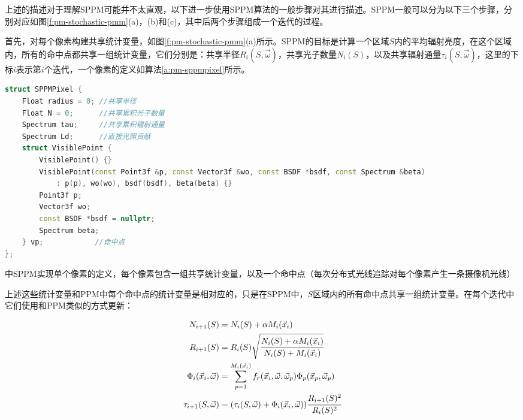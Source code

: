上述的描述对于理解SPPM可能并不太直观，以下进一步使用SPPM算法的一般步骤对其进行描述。SPPM一般可以分为以下三个步骤，分别对应如图\ref{f:pm-stochastic-pmm}(a)，(b)和(c)，其中后两个步骤组成一个迭代的过程。

首先，对每个像素构建共享统计变量，如图\ref{f:pm-stochastic-pmm}(a)所示。SPPM的目标是计算一个区域$S$内的平均辐射亮度，在这个区域内，所有的命中点都共享一组统计变量，它们分别是：共享半径$R_i(S,\vec{\omega})$，共享光子数量$N_i(S)$，以及共享辐射通量$\tau_i(S,\vec{\omega})$，这里的下标$i$表示第$i$个迭代，一个像素的定义如算法\ref{a:pm-sppmpixel}所示。

\begin{algorithm}
\begin{lstlisting}[language=C++, mathescape]
struct SPPMPixel {
    Float radius = 0; //共享半径
    Float N = 0;      //共享累积光子数量
    Spectrum tau;     //共享累积辐射通量
    Spectrum Ld;      //直接光照贡献
    struct VisiblePoint {
        VisiblePoint() {}
        VisiblePoint(const Point3f &p, const Vector3f &wo, const BSDF *bsdf, const Spectrum &beta)
            : p(p), wo(wo), bsdf(bsdf), beta(beta) {}
        Point3f p;
        Vector3f wo;
        const BSDF *bsdf = nullptr;
        Spectrum beta;
    } vp;            //命中点
};
\end{lstlisting}	
\caption{\cite{b:pbrt}中SPPM实现单个像素的定义，每个像素包含一组共享统计变量，以及一个命中点（每次分布式光线追踪对每个像素产生一条摄像机光线）}
\label{a:pm-sppmpixel}
\end{algorithm}

上述这些统计变量和PPM中每个命中点的统计变量是相对应的，只是在SPPM中，$S$区域内的所有命中点共享一组统计变量。在每个迭代中它们使用和PPM类似的方式更新：

\begin{equation}\label{e:pm-shared-statistics}
\begin{aligned}
	N_{i+1}(S) &=N_i(S)+\alpha M_i(\vec{x}_i)\\
	R_{i+1}(S) &=R_i(S)\sqrt{ \cfrac{N_i(S)+\alpha M_i(\vec{x}_i)}{N_i(S)+M_i(\vec{x}_i)}}\\
	\Phi_i(\vec{x}_i,\vec{\omega})&=\sum^{M_i(\vec{x}_i)}_{p=1}f_r(\vec{x}_i,\vec{\omega},\vec{\omega}_p)\Phi_p(\vec{x}_p,\vec{\omega}_p)\\
	\tau_{i+1}(S,\vec{\omega})&=(\tau_{i}(S,\vec{\omega})+\Phi_i(\vec{x}_i,\vec{\omega})) \cfrac{R_{i+1}(S)^{2}}{R_i (S)^{2}}
\end{aligned}
\end{equation}

